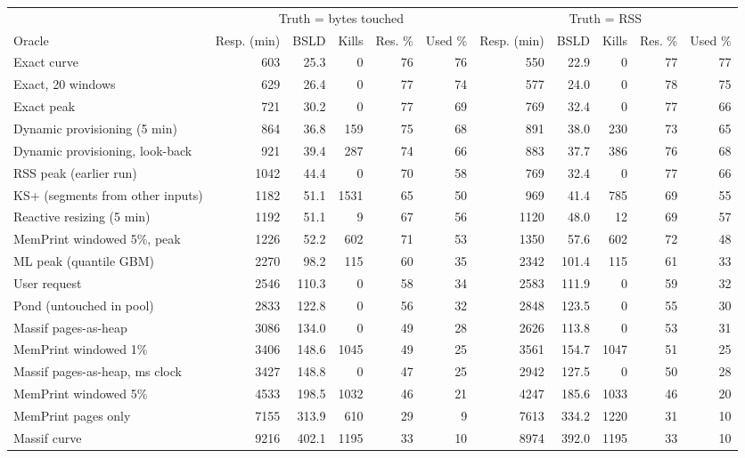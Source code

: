 \begin{tabular}{lrrrrrrrrrr}
\toprule
 & \multicolumn{5}{c}{Truth = bytes touched} & \multicolumn{5}{c}{Truth = RSS} \\
\cmidrule(lr){2-6} \cmidrule(lr){7-11}
Oracle & Resp. (min) & BSLD & Kills & Res. \% & Used \% & Resp. (min) & BSLD & Kills & Res. \% & Used \% \\
\midrule
Exact curve & 603 & 25.3 & 0 & 76 & 76 & 550 & 22.9 & 0 & 77 & 77 \\
Exact, 20 windows & 629 & 26.4 & 0 & 77 & 74 & 577 & 24.0 & 0 & 78 & 75 \\
Exact peak & 721 & 30.2 & 0 & 77 & 69 & 769 & 32.4 & 0 & 77 & 66 \\
Dynamic provisioning (5 min) & 864 & 36.8 & 159 & 75 & 68 & 891 & 38.0 & 230 & 73 & 65 \\
Dynamic provisioning, look-back & 921 & 39.4 & 287 & 74 & 66 & 883 & 37.7 & 386 & 76 & 68 \\
RSS peak (earlier run) & 1042 & 44.4 & 0 & 70 & 58 & 769 & 32.4 & 0 & 77 & 66 \\
KS+ (segments from other inputs) & 1182 & 51.1 & 1531 & 65 & 50 & 969 & 41.4 & 785 & 69 & 55 \\
Reactive resizing (5 min) & 1192 & 51.1 & 9 & 67 & 56 & 1120 & 48.0 & 12 & 69 & 57 \\
MemPrint windowed 5\%, peak & 1226 & 52.2 & 602 & 71 & 53 & 1350 & 57.6 & 602 & 72 & 48 \\
ML peak (quantile GBM) & 2270 & 98.2 & 115 & 60 & 35 & 2342 & 101.4 & 115 & 61 & 33 \\
User request & 2546 & 110.3 & 0 & 58 & 34 & 2583 & 111.9 & 0 & 59 & 32 \\
Pond (untouched in pool) & 2833 & 122.8 & 0 & 56 & 32 & 2848 & 123.5 & 0 & 55 & 30 \\
Massif pages-as-heap & 3086 & 134.0 & 0 & 49 & 28 & 2626 & 113.8 & 0 & 53 & 31 \\
MemPrint windowed 1\% & 3406 & 148.6 & 1045 & 49 & 25 & 3561 & 154.7 & 1047 & 51 & 25 \\
Massif pages-as-heap, ms clock & 3427 & 148.8 & 0 & 47 & 25 & 2942 & 127.5 & 0 & 50 & 28 \\
MemPrint windowed 5\% & 4533 & 198.5 & 1032 & 46 & 21 & 4247 & 185.6 & 1033 & 46 & 20 \\
MemPrint pages only & 7155 & 313.9 & 610 & 29 & 9 & 7613 & 334.2 & 1220 & 31 & 10 \\
Massif curve & 9216 & 402.1 & 1195 & 33 & 10 & 8974 & 392.0 & 1195 & 33 & 10 \\

\end{tabular}

